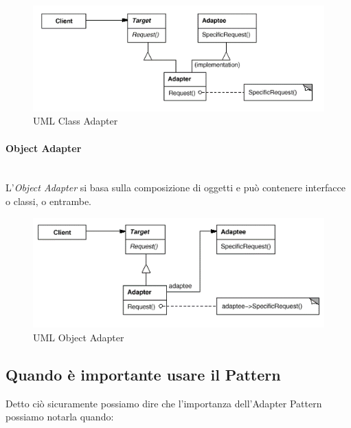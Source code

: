     \begin{figure}[htbp]
      \begin{center}
        \includegraphics[width=12cm]{img/class_adapter.png}
      \end{center}
      \caption{UML Class Adapter}
      \label{fig:dessin}
    \end{figure}
    
    \paragraph{Object Adapter} \hfill \\
    L’\emph{Object Adapter} si basa sulla composizione di oggetti e può 
    contenere interfacce o classi, o entrambe.
    
    \begin{figure}[htbp]
      \begin{center}
        \includegraphics[width=12cm]{img/object_adapter.png}
      \end{center}
      \caption{UML Object Adapter}
      \label{fig:dessin}
    \end{figure}
    
    \subsection{Quando è importante usare il Pattern}
    Detto ciò sicuramente possiamo dire che l'importanza dell'Adapter Pattern
    possiamo notarla quando:
    
